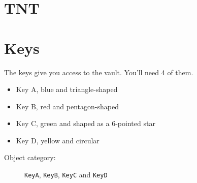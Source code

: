 \section{TNT}



\section{Keys}

The keys give you access to the vault. You'll need 4 of them.

\begin{itemize}
    \item Key A, blue and triangle-shaped
    \item Key B, red and pentagon-shaped
    \item Key C, green and shaped as a 6-pointed star
    \item Key D, yellow and circular
\end{itemize}

\begin{description}
    \item[Object category:] \texttt{KeyA}, \texttt{KeyB}, \texttt{KeyC} and \texttt{KeyD}
\end{description}